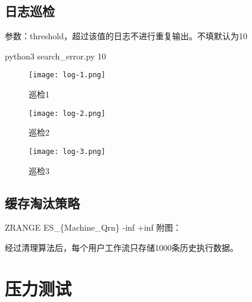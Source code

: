 


\subsection{日志巡检}

参数：threshold，超过该值的日志不进行重复输出。不填默认为10

python3 search\_error.py 10

\begin{figure}[H]
    \centering
    \texttt{[image: log-1.png]}
    \caption{巡检1}
    \label{fig:6-4-1}
\end{figure}

\begin{figure}[H]
    \centering
    \texttt{[image: log-2.png]}
    \caption{巡检2}
    \label{fig:6-4-2}
\end{figure}

\begin{figure}[H]
    \centering
    \texttt{[image: log-3.png]}
    \caption{巡检3}
    \label{fig:6-4-3}
\end{figure}

\subsection{缓存淘汰策略}
ZRANGE ES\_\{Machine\_Qrn\} -inf +inf
附图：

经过清理算法后，每个用户工作流只存储1000条历史执行数据。


\section{压力测试}

